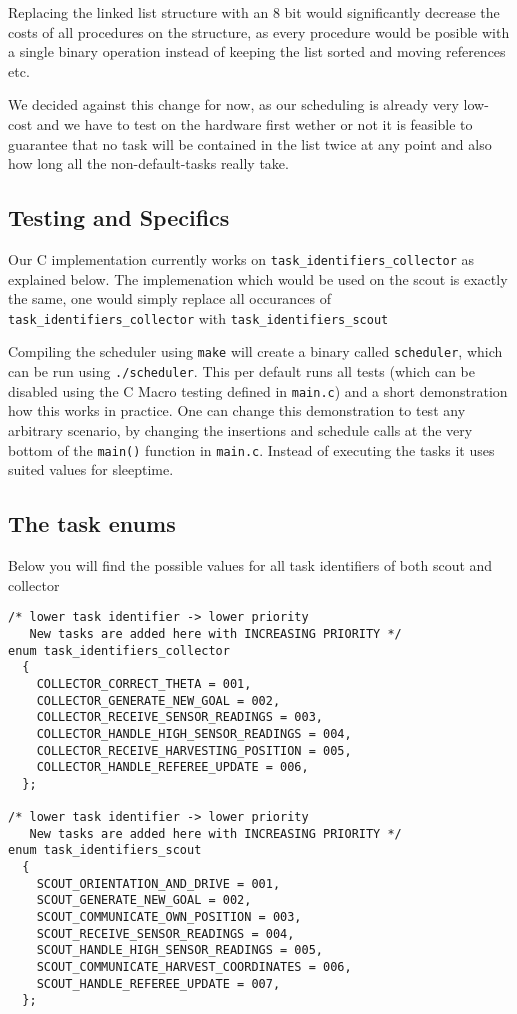 \documentclass[12pt]{article}
\begin{document}
Replacing the linked list structure with an 8 bit would significantly decrease the costs of all procedures on the structure, as every procedure would be posible with a single binary operation instead of keeping the list sorted and moving references etc.

We decided against this change for now, as our scheduling is already very low-cost and we have to test on the hardware first wether or not it is feasible to guarantee that no task will be contained in the list twice at any point and also how long all the non-default-tasks really take.


\subsection*{Testing and Specifics}
Our C implementation currently works on \verb!task_identifiers_collector! as explained below. The implemenation which would be used on the scout is exactly the same, one would simply replace all occurances of \verb!task_identifiers_collector! with \verb!task_identifiers_scout!

Compiling the scheduler using \verb!make! will create a binary called \verb!scheduler!, which can be run using \verb!./scheduler!. This per default runs all tests (which can be disabled using the C Macro testing defined in \verb!main.c!) and a short demonstration how this works in practice. One can change this demonstration to test any arbitrary scenario, by changing the insertions and schedule calls at the very bottom of the \verb!main()! function in \verb!main.c!. Instead of executing the tasks it uses suited values for sleeptime.

\newpage
\subsection*{The task enums}

Below you will find the possible values for all task identifiers of both scout and collector

\begin{lstlisting}[]
/* lower task identifier -> lower priority
   New tasks are added here with INCREASING PRIORITY */
enum task_identifiers_collector
  {
    COLLECTOR_CORRECT_THETA = 001,
    COLLECTOR_GENERATE_NEW_GOAL = 002,
    COLLECTOR_RECEIVE_SENSOR_READINGS = 003,
    COLLECTOR_HANDLE_HIGH_SENSOR_READINGS = 004,
    COLLECTOR_RECEIVE_HARVESTING_POSITION = 005,
    COLLECTOR_HANDLE_REFEREE_UPDATE = 006,
  };

/* lower task identifier -> lower priority
   New tasks are added here with INCREASING PRIORITY */
enum task_identifiers_scout
  {
    SCOUT_ORIENTATION_AND_DRIVE = 001,
    SCOUT_GENERATE_NEW_GOAL = 002,
    SCOUT_COMMUNICATE_OWN_POSITION = 003,
    SCOUT_RECEIVE_SENSOR_READINGS = 004,
    SCOUT_HANDLE_HIGH_SENSOR_READINGS = 005,
    SCOUT_COMMUNICATE_HARVEST_COORDINATES = 006,
    SCOUT_HANDLE_REFEREE_UPDATE = 007,
  };
\end{lstlisting}
\end{document}
